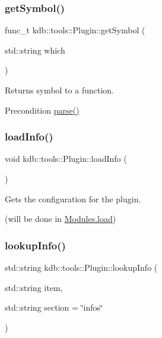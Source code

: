 \subsubsection{\texorpdfstring{get\+Symbol()}{getSymbol()}}
{\footnotesize\ttfamily func\+\_\+t kdb\+::tools\+::\+Plugin\+::get\+Symbol (\begin{DoxyParamCaption}\item[{std\+::string}]{which }\end{DoxyParamCaption})\hspace{0.3cm}{\ttfamily [inline]}}



Returns symbol to a function. 

\begin{DoxyPrecond}{Precondition}
\hyperlink{classkdb_1_1tools_1_1Plugin_adfcba2fbdeb436a1083410df804d5fb0}{parse()} 
\end{DoxyPrecond}
\mbox{\label{classkdb_1_1tools_1_1Plugin_a3a0c6a956d1714002ef9baf8c9d99167}} 
\subsubsection{\texorpdfstring{load\+Info()}{loadInfo()}}
{\footnotesize\ttfamily void kdb\+::tools\+::\+Plugin\+::load\+Info (\begin{DoxyParamCaption}{ }\end{DoxyParamCaption})}



Gets the configuration for the plugin. 

(will be done in \hyperlink{classkdb_1_1tools_1_1Modules_ae8d8c91745c9f517e6e8a556f1664f69}{Modules.\+load}) \mbox{\label{classkdb_1_1tools_1_1Plugin_a5f1dc42adda8340f330eb902812e667d}} 
\subsubsection{\texorpdfstring{lookup\+Info()}{lookupInfo()}}
{\footnotesize\ttfamily std\+::string kdb\+::tools\+::\+Plugin\+::lookup\+Info (\begin{DoxyParamCaption}\item[{std\+::string}]{item,  }\item[{std\+::string}]{section = {\ttfamily \char`\"{}infos\char`\"{}} }\end{DoxyParamCaption})}




